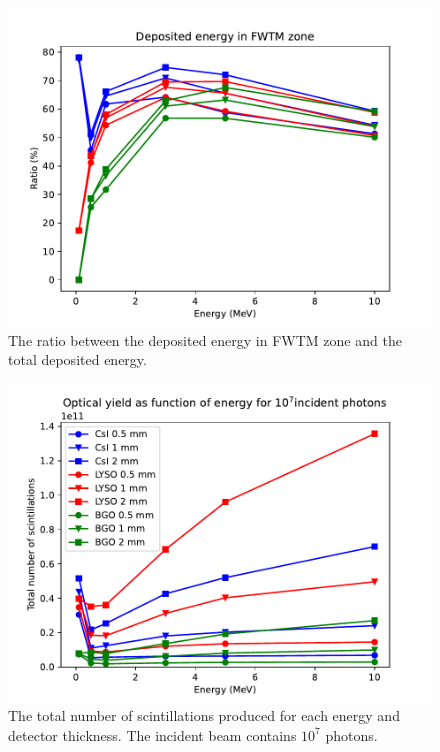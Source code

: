 \documentclass{article}
\begin{document}
\begin{figure}[H]
    \centering
    \includegraphics[width=0.8\linewidth]{images/task5/dep_ten.pdf}
    \caption{The ratio between the deposited energy in FWTM zone and the total deposited energy.}
\end{figure}
\begin{figure}[H]
    \centering
    \includegraphics[width=0.8\linewidth]{images/task5/scintillations_all.pdf}
    \caption{The total number of scintillations produced for each energy and detector thickness. 
    The incident beam contains $10^7$ photons.}
\end{figure}
\end{document}
